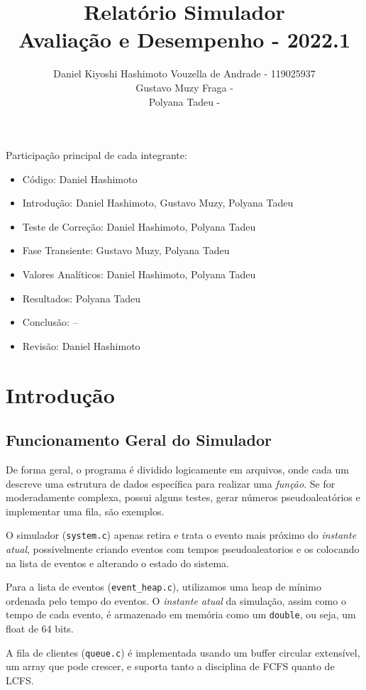 \documentclass[a4paper]{article}
\title{Relatório Simulador\\
  Avaliação e Desempenho - 2022.1}
\author{Daniel Kiyoshi Hashimoto Vouzella de Andrade - 119025937
  \\
Gustavo Muzy Fraga -
  \\
Polyana Tadeu -
}
\date{}
\newcommand{\arq}{\texttt}
\newcommand{\inlcode}{\texttt}
\begin{document}
\maketitle

\vfill

Participação principal de cada integrante:
\begin{itemize}
    \item \large Código: 
    \hfill Daniel Hashimoto
    \item \large Introdução: 
    \hfill Daniel Hashimoto, Gustavo Muzy, Polyana Tadeu
    \item \large Teste de Correção: 
    \hfill Daniel Hashimoto, Polyana Tadeu
    \item \large Fase Transiente: 
    \hfill Gustavo Muzy, Polyana Tadeu
    \item \large Valores Analíticos: 
    \hfill Daniel Hashimoto, Polyana Tadeu
    \item \large Resultados: 
    \hfill Polyana Tadeu
    \item \large Conclusão: 
    \hfill --
    \item \large Revisão: 
    \hfill Daniel Hashimoto
\end{itemize}

\newpage
\section{Introdução}
\subsection{Funcionamento Geral do Simulador}
De forma geral,
o programa é dividido logicamente em arquivos,
onde cada um descreve uma estrutura de dados
específica para realizar uma \emph{função}.
Se for moderadamente complexa, possui alguns testes,
gerar números pseudoaleatórios e implementar uma fila,
são exemplos.

O simulador (\arq{system.c})
apenas retira e trata o evento mais próximo do \emph{instante atual},
possivelmente criando eventos com tempos pseudoaleatorios
e os colocando na lista de eventos e alterando o estado do sistema.

Para a lista de eventos (\arq{event\_heap.c}),
utilizamos uma heap de mínimo ordenada pelo tempo do eventos.
O \emph{instante atual} da simulação,
assim como o tempo de cada evento,
é armazenado em memória como um \inlcode{double}, ou seja,
um float de 64 bits.

A fila de clientes (\arq{queue.c})
é implementada usando um buffer circular extensível,
um array que pode crescer,
e suporta tanto a disciplina de FCFS quanto de LCFS.
\end{document}
